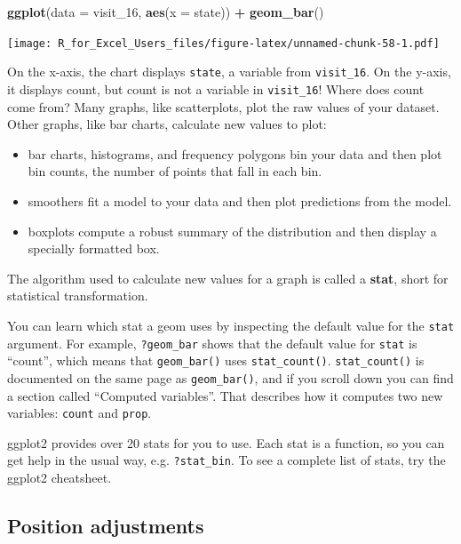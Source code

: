 \documentclass[]{book}
\newenvironment{Shaded}{\begin{snugshade}}{\end{snugshade}}
\newcommand{\DataTypeTok}[1]{\textcolor[rgb]{0.13,0.29,0.53}{#1}}
\newcommand{\DecValTok}[1]{\textcolor[rgb]{0.00,0.00,0.81}{#1}}
\newcommand{\KeywordTok}[1]{\textcolor[rgb]{0.13,0.29,0.53}{\textbf{#1}}}
\newcommand{\NormalTok}[1]{#1}
\newcommand{\OperatorTok}[1]{\textcolor[rgb]{0.81,0.36,0.00}{\textbf{#1}}}
\newcommand{\StringTok}[1]{\textcolor[rgb]{0.31,0.60,0.02}{#1}}
\begin{document}
\begin{Shaded}
\begin{Highlighting}[]
\KeywordTok{ggplot}\NormalTok{(}\DataTypeTok{data =}\NormalTok{ visit_}\DecValTok{16}\NormalTok{, }\KeywordTok{aes}\NormalTok{(}\DataTypeTok{x =}\NormalTok{ state)) }\OperatorTok{+}\StringTok{ }
\StringTok{  }\KeywordTok{geom_bar}\NormalTok{()}
\end{Highlighting}
\end{Shaded}

\texttt{[image: R\_for\_Excel\_Users\_files/figure-latex/unnamed-chunk-58-1.pdf]}

On the x-axis, the chart displays \texttt{state}, a variable from \texttt{visit\_16}. On the y-axis, it displays count, but count is not a variable in \texttt{visit\_16}! Where does count come from? Many graphs, like scatterplots, plot the raw values of your dataset. Other graphs, like bar charts, calculate new values to plot:

\begin{itemize}
\item
  bar charts, histograms, and frequency polygons bin your data
  and then plot bin counts, the number of points that fall in each bin.
\item
  smoothers fit a model to your data and then plot predictions from the
  model.
\item
  boxplots compute a robust summary of the distribution and then display a
  specially formatted box.
\end{itemize}

The algorithm used to calculate new values for a graph is called a \textbf{stat}, short for statistical transformation.

You can learn which stat a geom uses by inspecting the default value for the \texttt{stat} argument. For example, \texttt{?geom\_bar} shows that the default value for \texttt{stat} is ``count'', which means that \texttt{geom\_bar()} uses \texttt{stat\_count()}. \texttt{stat\_count()} is documented on the same page as \texttt{geom\_bar()}, and if you scroll down you can find a section called ``Computed variables''. That describes how it computes two new variables: \texttt{count} and \texttt{prop}.

ggplot2 provides over 20 stats for you to use. Each stat is a function, so you can get help in the usual way, e.g. \texttt{?stat\_bin}. To see a complete list of stats, try the ggplot2 cheatsheet.

\hypertarget{position-adjustments}{%
\subsection{Position adjustments}\label{position-adjustments}}
\end{document}
